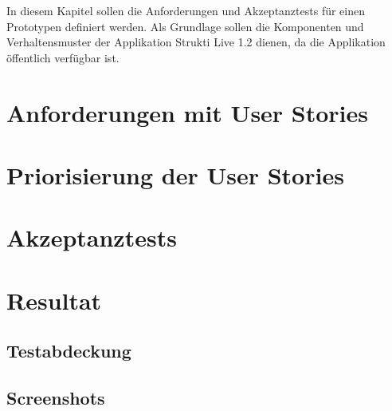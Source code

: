 In diesem Kapitel sollen die Anforderungen und Akzeptanztests für einen
Prototypen definiert werden. Als Grundlage sollen die Komponenten und
Verhaltensmuster der Applikation Strukti Live 1.2 dienen, da die Applikation
öffentlich verfügbar ist.

\section{Anforderungen mit User Stories}

\section{Priorisierung der User Stories}

\section{Akzeptanztests}

\section{Resultat}

\subsection{Testabdeckung}

\subsection{Screenshots}